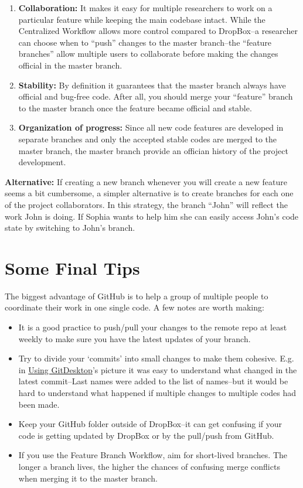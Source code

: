 \documentclass{article}
\begin{document}
\begin{enumerate}
    \item \textbf{Collaboration:} It makes it easy for multiple researchers to work on a particular feature while keeping the main codebase intact. While the Centralized Workflow allows more control compared to DropBox--a researcher can choose when to ``push'' changes to the master branch--the ``feature branches'' allow multiple users to collaborate before making the changes official in the master branch.
    \item \textbf{Stability:} By definition it guarantees that the master branch always have official and bug-free code. After all, you should merge your ``feature'' branch to the master branch once the feature became official and stable.
    \item \textbf{Organization of progress:} Since all new code features are developed in separate branches and only the accepted stable codes are merged to the master branch,  the master branch provide an offician history of the project development.
\end{enumerate} 
\textbf{Alternative:} If creating a new branch whenever you will create a new feature seems a bit cumbersome, a simpler alternative is to create branches for each one of the project collaborators. In this strategy, the branch ``John'' will reflect the work John is doing. If Sophia wants to help him she can easily access John's code state by switching to John's branch.

    
\section{Some Final Tips}
The biggest advantage of GitHub is to help a group of multiple people to coordinate their work in one single code. A few notes are worth making:
\begin{itemize}
    \item It is a good practice to push/pull your changes to the remote repo at least weekly to make sure you have the latest updates of your branch.
    \item Try to divide your `commits' into small changes to make them cohesive. E.g. in \hyperref[sec:GitDesktop]{Using GitDesktop}'s picture it was easy to understand what changed in the latest commit--Last names were added to the list of names--but it would be hard to understand what happened if multiple changes to multiple codes had been made.
    \item Keep your GitHub folder outside of DropBox--it can get confusing if your code is getting updated by DropBox or by the pull/push from GitHub.
    \item If you use the Feature Branch Workflow, aim for short-lived branches. The longer a branch lives, the higher the chances of confusing merge conflicts when merging it to the master branch.
\end{itemize}
\end{document}
